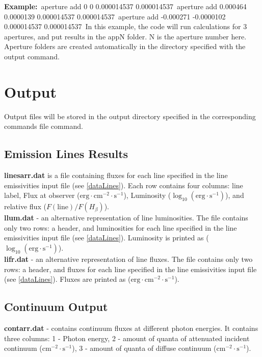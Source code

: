 \documentclass[a4paper]{article}
\begin{document}
    {\bf Example:}\
aperture add 0 0 0.000014537 0.000014537\
aperture add 0.000464 0.0000139 0.000014537 0.000014537\
aperture add -0.000271 -0.0000102 0.000014537 0.000014537\
In this example, the code will run calculations for 3 apertures, and put results in the
app{N} folder.
N is the aperture number here. Aperture folders are created automatically
in the directory specified with the output command.

\section{Output}
Output files will be stored in the output directory specified in the corresponding commands file command.

\subsection{Emission Lines Results}
{\bf linesarr.dat} is a file containing fluxes for each line specified in the line emissivities input file (see \ref{dataLines}).
Each row contains four columns: line label, Flux at observer ($\mathrm{erg} \cdot \mathrm{cm}^{-2} \cdot \mathrm{s}^{-1}$), Luminosity ($\log_{10}(\mathrm{erg} \cdot \mathrm{s}^{-1})$),
and relative flux ($F(\text{line})/F(H_{\beta})$).\\
{\bf llum.dat} - an alternative representation of line luminosities. The file contains only two rows: a header, and luminosities for each line specified in the line emissivities input file (see \ref{dataLines}).
Luminosity is printed as ($\log_{10}(\mathrm{erg} \cdot \mathrm{s}^{-1})$). \\
{\bf lifr.dat} - an alternative representation of line fluxes. The file contains only two rows: a header, and fluxes for each line specified in the line emissivities input file (see \ref{dataLines}).
Fluxes are printed as ($\mathrm{erg} \cdot \mathrm{cm}^{-2} \cdot \mathrm{s}^{-1}$).

\subsection{Continuum Output}
{\bf contarr.dat} - contains continuum fluxes at different photon energies. It contains three columns:
1 - Photon energy, 2 - amount of quanta of attenuated incident continuum ($\mathrm{cm}^{-2} \cdot \mathrm{s}^{-1}$), 3 - amount of quanta of diffuse continuum ($\mathrm{cm}^{-2} \cdot \mathrm{s}^{-1}$).\\
\end{document}
